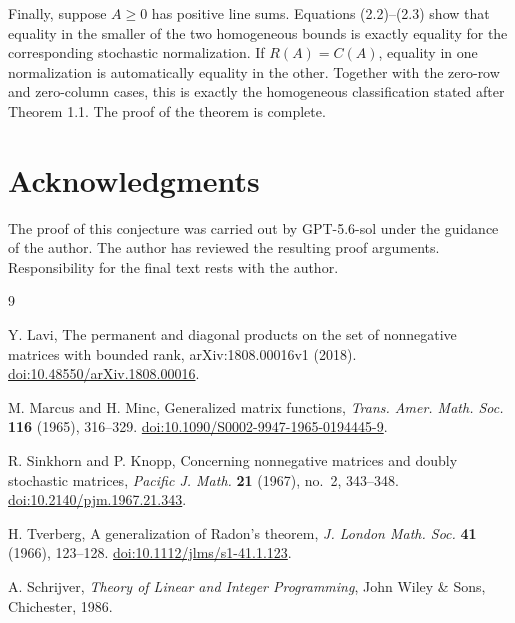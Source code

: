 \documentclass[11pt]{article}
\theoremstyle{remark}
\begin{document}
Finally, suppose \(A\geq0\) has positive line sums. Equations (2.2)--(2.3)
show that equality in the smaller of the two homogeneous bounds is exactly
equality for the corresponding stochastic normalization. If
\(R(A)=C(A)\), equality in one normalization is automatically equality in
the other. Together with the zero-row and zero-column cases, this is exactly
the homogeneous classification stated after Theorem 1.1. The proof of the
theorem is complete.

\section*{Acknowledgments}

The proof of this conjecture was carried out by GPT-5.6-sol under the guidance
of the author. The author has reviewed the resulting proof arguments.
Responsibility for the final text rests with the author.

\begin{thebibliography}{9}

Y. Lavi,
\newblock The permanent and diagonal products on the set of nonnegative
matrices with bounded rank,
\newblock arXiv:1808.00016v1 (2018).
\newblock \href{https://doi.org/10.48550/arXiv.1808.00016}{doi:10.48550/arXiv.1808.00016}.

M. Marcus and H. Minc,
\newblock Generalized matrix functions,
\newblock \emph{Trans. Amer. Math. Soc.} \textbf{116} (1965), 316--329.
\newblock \href{https://doi.org/10.1090/S0002-9947-1965-0194445-9}{doi:10.1090/S0002-9947-1965-0194445-9}.

R. Sinkhorn and P. Knopp,
\newblock Concerning nonnegative matrices and doubly stochastic matrices,
\newblock \emph{Pacific J. Math.} \textbf{21} (1967), no.~2, 343--348.
\newblock \href{https://doi.org/10.2140/pjm.1967.21.343}{doi:10.2140/pjm.1967.21.343}.

H. Tverberg,
\newblock A generalization of Radon's theorem,
\newblock \emph{J. London Math. Soc.} \textbf{41} (1966), 123--128.
\newblock \href{https://doi.org/10.1112/jlms/s1-41.1.123}{doi:10.1112/jlms/s1-41.1.123}.

A. Schrijver,
\newblock \emph{Theory of Linear and Integer Programming},
\newblock John Wiley \& Sons, Chichester, 1986.

\end{thebibliography}
\end{document}
